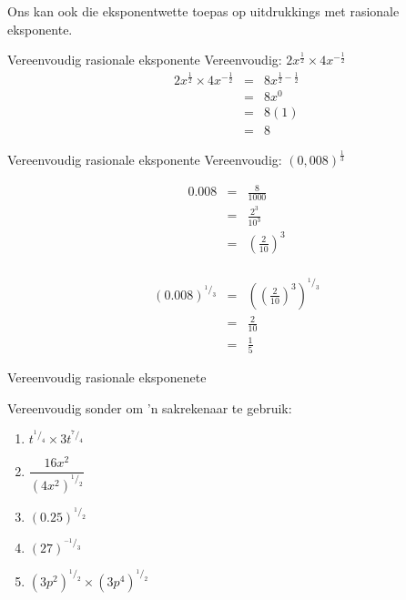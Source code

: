 Ons kan ook die eksponentwette toepas op uitdrukkings met rasionale eksponente.
\par
{}

\begin{wex}{Vereenvoudig rasionale eksponente }
{Vereenvoudig: $2x^{\frac{1}{2}}\times 4x^{-\frac{1}{2}}$}
{
\begin{eqnarray*}
 2x^{\frac{1}{2}} \times 4x^{-\frac{1}{2}} & = & 8x^{\frac{1}{2}-\frac{1}{2}} \\
					  & = & 8x^0 \\
					  & = & 8(1) \\
					  & = & 8 
\end{eqnarray*}
}
\end{wex}


\begin{wex}{Vereenvoudig rasionale eksponente} 
{Vereenvoudig: $(0,008)^{\frac{1}{3}}$}
{%

\begin{eqnarray*}
 0.008 & = & \frac{8}{1000} \\
       & = & \frac{2^3}{10^3} \\
       & = & \left(\frac{2}{10}\right)^3\\
\end{eqnarray*}

\begin{eqnarray*}
 (0.008)^{^1/_3} & = & \left(\left(\frac{2}{10}\right)^3\right)^{^1/_3} \\
		 & = & \frac{2}{10} \\
		 & = & \frac{1}{5}
\end{eqnarray*}
}
\end{wex}

\begin{exercises}{Vereenvoudig rasionale eksponenete}
{
Vereenvoudig sonder om ’n sakrekenaar te gebruik:
\begin{multicols}{2}
\begin{enumerate}[noitemsep, label=\textbf{\arabic*}., itemsep=5pt]
 \item $ t^{^1/_4} \times 3t^{^7/_4} $
 \item $ \dfrac{16x^2}{(4x^2)^{^1/_2}} $
 \item $ (0.25)^{^1/_2} $
 \item $ (27)^{^{-1}/_3} $
 \item $ (3p^2)^{^1/_2} \times (3p^4)^{^1/_2} $
\end{enumerate}
\end{multicols}

}
\end{exercises}







